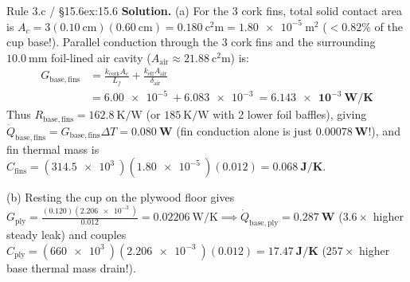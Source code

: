 \begin{twocol}[0.50]
\begin{workedexample}{Rule 3.c / §15.6}{ex:15.6}
\textbf{Solution.}
(a) For the 3 cork fins, total solid contact area is $A_c = 3(\SI{0.10}{\centi\meter})(\SI{0.60}{\centi\meter}) = \SI{0.180}{\square\centi\meter} = \SI{1.80e-5}{\square\meter}$ ($<0.82\%$ of the cup base!). Parallel conduction through the 3 cork fins and the surrounding $\SI{10.0}{\milli\meter}$ foil-lined air cavity ($A_{\mathrm{air}} \approx \SI{21.88}{\square\centi\meter}$) is:
\[
\begin{aligned}
  G_{\mathrm{base,fins}} &= \frac{k_{\mathrm{cork}}A_c}{L_f} + \frac{k_{\mathrm{eff}}A_{\mathrm{air}}}{\delta_{\mathrm{air}}} \\
  &= \SI{6.00e-5}{} + \SI{6.083e-3}{} = \mathbf{\SI{6.143e-3}{\watt\per\kelvin}}
\end{aligned}
\]
Thus $R_{\mathrm{base,fins}} = \SI{162.8}{\kelvin\per\watt}$ (or $\SI{185}{\kelvin\per\watt}$ with 2 lower foil baffles), giving $\dot{Q}_{\mathrm{base,fins}} = G_{\mathrm{base,fins}}\Delta T = \mathbf{\SI{0.080}{\watt}}$ (fin conduction alone is just $\mathbf{\SI{0.00078}{\watt}}$!), and fin thermal mass is $C_{\mathrm{fins}} = (\SI{314.5e3}{})(\SI{1.80e-5}{})(0.012) = \mathbf{\SI{0.068}{\joule\per\kelvin}}$.

(b) Resting the cup on the plywood floor gives $G_{\mathrm{ply}} = \frac{(0.120)(\SI{2.206e-3}{})}{0.012} = \SI{0.02206}{\watt\per\kelvin} \implies \dot{Q}_{\mathrm{base,ply}} = \mathbf{\SI{0.287}{\watt}}$ ($3.6\times$ higher steady leak) and couples $C_{\mathrm{ply}} = (\SI{660e3}{})(\SI{2.206e-3}{})(0.012) = \mathbf{\SI{17.47}{\joule\per\kelvin}}$ ($257\times$ higher base thermal mass drain!).
\end{workedexample}
\end{twocol}


